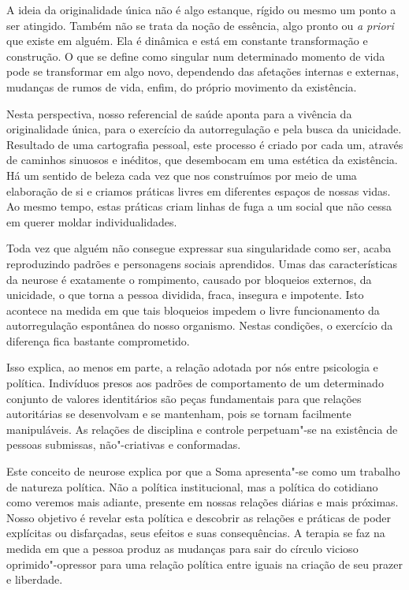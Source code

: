 A ideia da originalidade única não é algo estanque, rígido ou mesmo um
ponto a ser atingido. Também não se trata da noção de essência, algo
pronto ou \emph{a priori} que existe em alguém. Ela é dinâmica e está em
constante transformação e construção. O que se define como singular num
determinado momento de vida pode se transformar em algo novo,
dependendo das afetações internas e externas, mudanças de rumos de vida,
enfim, do próprio movimento da existência.

Nesta perspectiva, nosso referencial de saúde aponta para a vivência da
originalidade única, para o exercício da autorregulação e pela busca da
unicidade. Resultado de uma cartografia pessoal, este processo é criado
por cada um, através de caminhos sinuosos e inéditos, que desembocam em
uma estética da existência. Há um sentido de beleza cada vez que nos
construímos por meio de uma elaboração de si e criamos práticas livres
em diferentes espaços de nossas vidas. Ao mesmo tempo, estas práticas
criam linhas de fuga a um social que não cessa em querer moldar
individualidades.

Toda vez que alguém não consegue expressar sua singularidade como ser,
acaba reproduzindo padrões e personagens sociais aprendidos. Umas das
características da neurose é exatamente o rompimento, causado por
bloqueios externos, da unicidade, o que torna a pessoa dividida, fraca,
insegura e impotente. Isto acontece na medida em que tais bloqueios
impedem o livre funcionamento da autorregulação espontânea do nosso
organismo. Nestas condições, o exercício da diferença fica bastante
comprometido.

Isso explica, ao menos em parte, a relação adotada por nós entre
psicologia e política. Indivíduos presos aos padrões de comportamento de
um determinado conjunto de valores identitários são peças fundamentais
para que relações autoritárias se desenvolvam e se mantenham, pois se
tornam facilmente manipuláveis. As relações de disciplina e controle
perpetuam"-se na existência de pessoas submissas, não"-criativas e
conformadas.

Este conceito de neurose explica por que a Soma apresenta"-se como um
trabalho de natureza política. Não a política institucional, mas a
política do cotidiano como veremos mais adiante, presente em nossas
relações diárias e mais próximas. Nosso objetivo é revelar esta política
e descobrir as relações e práticas de poder explícitas ou disfarçadas,
seus efeitos e suas consequências. A terapia se faz na medida em que a
pessoa produz as mudanças para sair do círculo vicioso oprimido"-opressor
para uma relação política entre iguais na criação de seu prazer e
liberdade.

